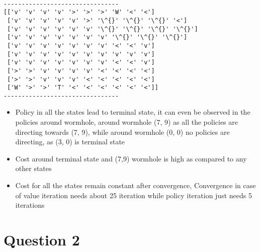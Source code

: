 \documentclass[11pt]{article}
\providecommand{\tightlist}{%
      \setlength{\itemsep}{0pt}\setlength{\parskip}{0pt}}
\begin{document}
    \begin{center}
    \end{center}
    { \hspace*{\fill} \\}
    
    \begin{Verbatim}[commandchars=\\\{\}]
--------------------------------
[['v' 'v' 'v' 'v' '>' '>' '>' 'W' '<' '<']
 ['v' 'v' 'v' 'v' 'v' '>' '\^{}' '\^{}' '\^{}' '<']
 ['v' 'v' 'v' 'v' 'v' 'v' '\^{}' '\^{}' '\^{}' '\^{}']
 ['v' 'v' 'v' 'v' 'v' 'v' 'v' '\^{}' '\^{}' '\^{}']
 ['v' 'v' 'v' 'v' 'v' 'v' 'v' '<' '<' 'v']
 ['v' 'v' 'v' 'v' 'v' 'v' 'v' 'v' 'v' 'v']
 ['v' 'v' 'v' 'v' 'v' 'v' 'v' '<' '<' 'v']
 ['>' '>' 'v' 'v' 'v' 'v' '<' '<' '<' '<']
 ['>' '>' 'v' 'v' 'v' '<' '<' '<' '<' '<']
 ['W' '>' '>' 'T' '<' '<' '<' '<' '<' '<']]
--------------------------------

    \end{Verbatim}

    \begin{itemize}
\tightlist
\item
  Policy in all the states lead to terminal state, it can even be
  observed in the policies around wormhole, around wormhole (7, 9) as
  all the policies are directing towards (7, 9), while around wormhole
  (0, 0) no policies are directing, as (3, 0) is terminal state
\item
  Cost around terminal state and (7,9) wormhole is high as compared to
  any other states
\item
  Cost for all the states remain constant after convergence, Convergence
  in case of value iteration needs about 25 iteration while policy
  iteration just needs 5 iterations
\end{itemize}

    

    \section{Question 2}\label{question-2}
\end{document}
